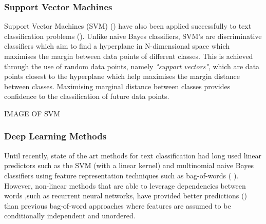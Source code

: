 \subsubsection{Support Vector Machines}
Support Vector Machines (SVM) (\cite{Cortes1995}) have also been applied successfully to text classification problems (\cite{Joachims1998}). Unlike naive Bayes classifiers, SVM's are discriminative classifiers which aim to find a hyperplane in N-dimensional space which maximises the margin between data points of different classes. This is achieved through the use of random data points, namely \textit{"support vectors"}, which are data points closest to the hyperplane which help maximises the margin distance between classes. Maximising marginal distance between classes provides confidence to the classification of future data points.

\noindent
\newline 
IMAGE OF SVM

\subsubsection{Deep Learning Methods}
Until recently, state of the art methods for text classification had long used linear predictors such as the SVM (with a linear kernel) and multinomial naive Bayes classifiers using feature representation techniques such as bag-of-words (\cite{Joachims1998} \cite{Lewis2004}). However, non-linear methods that are able to leverage dependencies between words ,such as recurrent neural networks, have provided better predictions (\cite{Dai2015a}) than previous bag-of-word approaches where features are assumed to be conditionally independent and unordered.